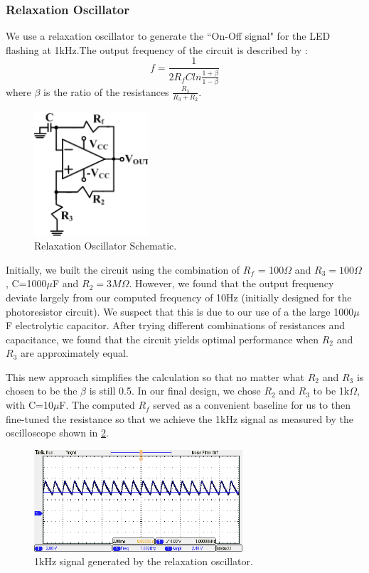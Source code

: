 \documentclass[twocolumn]{article}
\begin{document}
\subsubsection{Relaxation Oscillator}
We use a relaxation oscillator to generate the ``On-Off signal" for the LED flashing at 1kHz.The output frequency of the circuit is described by :
\begin{equation}
f=\frac{1}{2 R_f C ln\frac{1+\beta}{1-\beta}}
\end{equation}
where $\beta$ is the ratio of the resistances $\frac{R_3}{R_3+R_2}$.
\begin{figure}[h!]
 \centering
 \includegraphics[width=120pt]{figure/relax_osc.png}
\caption{Relaxation Oscillator Schematic.}
\label{relax_osc}
\end{figure}
\par Initially, we built the circuit using the combination of $R_f$ = 100$\Omega$ and $R_3 = 100\Omega$, C=1000$\mu$F and $R_2 = 3 M\Omega$. However, we found that the output frequency deviate largely from our computed frequency of 10Hz (initially designed for the photoresistor circuit). We suspect that this is due to our use of a the large 1000$\mu$F electrolytic capacitor. After trying different combinations of resistances and capacitance, we found that the circuit yields optimal performance when $R_2$ and $R_3$ are approximately equal. %
\par This new approach simplifies the calculation so that no matter what $R_2$ and $R_3$ is chosen to be the $\beta$ is still 0.5. In our final design, we chose $R_2$ and $R_3$ to be 1k$\Omega$, with C=10$\mu$F. The computed $R_f$ served as a convenient baseline for us to then fine-tuned the resistance so that we achieve the 1kHz signal as measured by the oscilloscope shown in \ref{relax_osc_b4boost}.
\begin{figure}[h!]
 \centering
 \includegraphics[width=220pt]{figure/relax_osc_beforeboost.png}
\caption{1kHz signal generated by the relaxation oscillator.}
\label{relax_osc_b4boost}
\end{figure}
\end{document}
